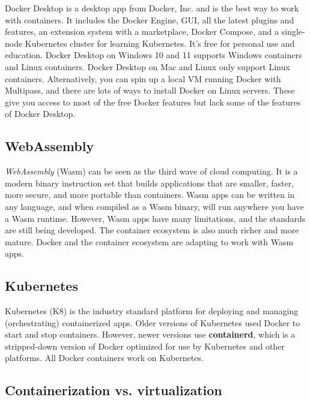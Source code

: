 \documentclass[table, xcdraw]{article}%
\begin{document}
Docker Desktop is a desktop app from Docker, Inc. and is the best way to work with containers. It includes the Docker Engine, GUI, all the latest plugins and features, an extension system with a marketplace, Docker Compose, and a single-node Kubernetes cluster for learning Kubernetes. It’s free for personal use and education. Docker Desktop on Windows 10 and 11 supports Windows containers and Linux containers. Docker Desktop on Mac and Linux only support Linux containers. Alternatively, you can spin up a local VM running Docker with Multipass, and there are lots of ways to install Docker on Linux servers. These give you access to most of the free Docker features but lack some of the features of Docker Desktop.

\subsection{WebAssembly}

\emph{WebAssembly} (Wasm) can be seen as the third wave of cloud computing. It is a modern binary instruction set that builds applications that are smaller, faster, more secure, and more portable than containers. Wasm apps can be written in any language, and when compiled as a Wasm binary, will run anywhere you have a Wasm runtime. However, Wasm apps have many limitations, and the standards are still being developed. The container ecosystem is also much richer and more mature. Docker and the container ecosystem are adapting to work with Wasm apps.

\subsection{Kubernetes}

Kubernetes (K8) is the industry standard platform for deploying and managing (orchestrating) containerized apps. Older versions of Kubernetes used Docker to start and stop containers. However, newer versions use \textbf{containerd}, which is a stripped-down version of Docker optimized for use by Kubernetes and other platforms. All Docker containers work on Kubernetes.

\subsection{Containerization vs. virtualization}
\end{document}
